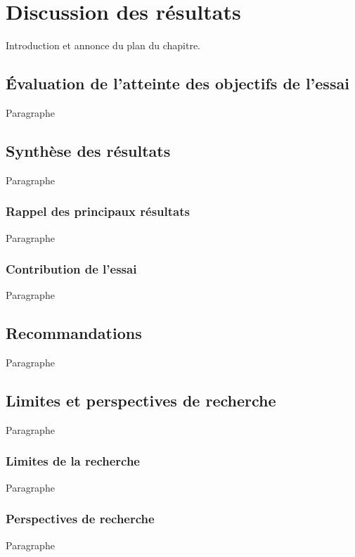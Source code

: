 \chapter{Discussion des résultats} \label{chap:discussion}

Introduction et annonce du plan du chapitre.

\section{Évaluation de l’atteinte des objectifs de l’essai} \label{sec:atteinte}
Paragraphe
\lipsum[1] %

\section{Synthèse des résultats} \label{sec:synthese-resultats}
Paragraphe
\lipsum[1] %

\subsection{Rappel des principaux résultats} \label{subsec:rappel-resultats}
Paragraphe
\lipsum[1] %

\subsection{Contribution de l'essai} \label{subsec:contribution}
Paragraphe
\lipsum[1] %

\section{Recommandations} \label{sec:recommandations}
Paragraphe
\lipsum[1] %

\section{Limites et perspectives de recherche} \label{sec:limites-perspectives}
Paragraphe
\lipsum[1] %

\subsection{Limites de la recherche} \label{subsec:limites-recherche}
Paragraphe
\lipsum[1] %

\subsection{Perspectives de recherche} \label{subsec:perspectives-recherche}
Paragraphe
\lipsum[1] %
